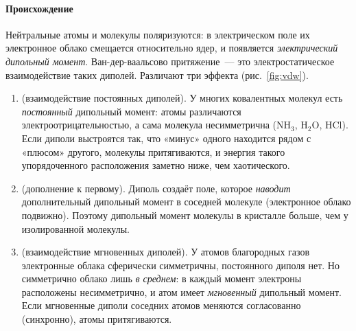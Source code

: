 \paragraph{Происхождение}
Нейтральные атомы и молекулы поляризуются: в электрическом поле их
электронное облако смещается относительно ядер, и появляется
\emph{электрический дипольный момент}. Ван-дер-ваальсово притяжение~—
это электростатическое взаимодействие таких диполей. Различают три
эффекта (рис.~\ref{fig:vdw}).
\begin{enumerate}
\item {} (взаимодействие постоянных диполей). У
многих ковалентных молекул есть \emph{постоянный} дипольный момент: атомы
различаются электроотрицательностью, а сама молекула несимметрична
(NH$_3$, H$_2$O, HCl). Если диполи выстроятся так, что «минус» одного
находится рядом с «плюсом» другого, молекулы притягиваются, и энергия
такого упорядоченного расположения заметно ниже, чем хаотического.
\item {} (дополнение к первому). Диполь создаёт поле,
которое \emph{наводит} дополнительный дипольный момент в соседней
молекуле (электронное облако подвижно). Поэтому дипольный момент молекулы
в кристалле больше, чем у изолированной молекулы.
\item {} (взаимодействие мгновенных диполей). У атомов
благородных газов электронные облака сферически симметричны, постоянного
диполя нет. Но симметрично облако лишь \emph{в среднем}: в каждый момент
электроны расположены несимметрично, и атом имеет \emph{мгновенный}
дипольный момент. Если мгновенные диполи соседних атомов меняются
согласованно (синхронно), атомы притягиваются.
\end{enumerate}

